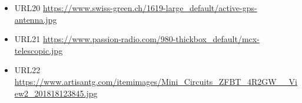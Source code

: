 \begin{itemize}
	\item URL20 \href{https://www.swiss-green.ch/1619-large_default/active-gps-antenna.jpg}{\url{https://www.swiss-green.ch/1619-large_default/active-gps-antenna.jpg}}


	\item URL21 \href{https://www.passion-radio.com/980-thickbox_default/mcx-telescopic.jpg}{\url{https://www.passion-radio.com/980-thickbox_default/mcx-telescopic.jpg}}

	\item URL22 \href{https://www.artisantg.com/itemimages/Mini_Circuits_ZFBT_4R2GW__View2_201818123845.jpg}{\url{https://www.artisantg.com/itemimages/Mini_Circuits_ZFBT_4R2GW__View2_201818123845.jpg}}

\end{itemize}

